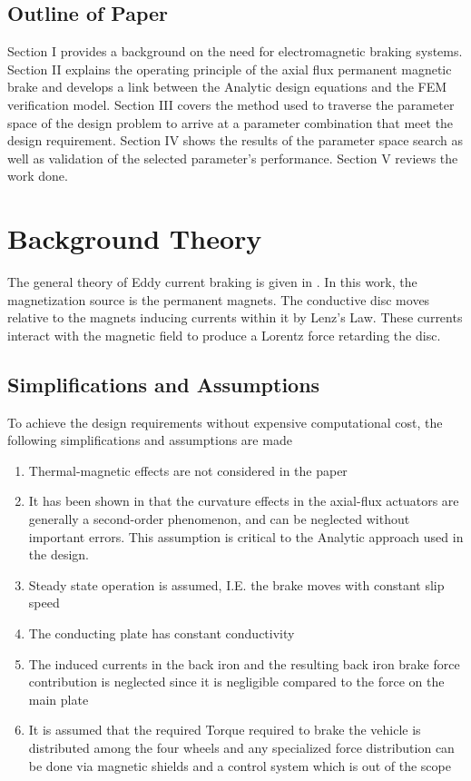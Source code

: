 \documentclass[lettersize,journal]{IEEEtran}
\begin{document}
\subsection{Outline of Paper}
Section I provides a background on the need for electromagnetic braking systems. Section II explains the operating principle of the axial flux permanent magnetic brake and develops a link between the Analytic design equations and the FEM verification model.  Section III covers the method used to traverse the parameter space of the design problem to arrive at a parameter combination that meet the design requirement. Section IV shows the results of the parameter space search as well as validation of the selected parameter's performance. Section V reviews the work done. 

\section{Background Theory}
The general theory of Eddy current braking is given in \cite{7394612}. In this work, the magnetization source is the permanent magnets. The conductive disc moves relative to the magnets inducing currents within it by Lenz's Law. These currents interact with the magnetic field to produce a Lorentz force retarding the disc. %
\subsection{Simplifications and Assumptions}
To achieve the design requirements without expensive computational cost, the following simplifications and assumptions are made
\begin{enumerate}
    \item Thermal-magnetic effects are not considered in the paper
    \item It has been shown in \cite{delabarriere_2012_3d} that the curvature effects in the axial-flux actuators are generally a second-order phenomenon, and can be neglected without important errors. This assumption is critical to the Analytic approach used in the design.
    \item Steady state operation is assumed, I.E. the brake moves with constant slip speed
    \item The conducting plate has constant conductivity
    \item The induced currents in the back iron and the resulting back iron brake force contribution is neglected since it is negligible compared to the force on the main plate \cite{lubin_2015_3d}
    \item It is assumed that the required Torque required to brake the vehicle is distributed among the four wheels and any specialized force distribution can be done via magnetic shields and a control system which is out of the scope
\end{enumerate}
\end{document}
